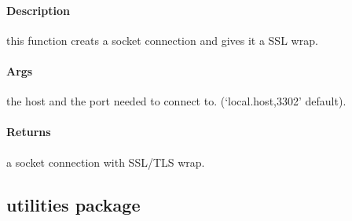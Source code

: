\documentclass[letterpaper,10pt,english]{sphinxmanual}
\begin{document}

\begin{fulllineitems}
\label{\detokenize{connection:connection.socket_connection.connect_to_ssl_socket}}
\pysigstartsignatures
{}
\pysigstopsignatures

\paragraph{Description}
\label{\detokenize{connection:description}}
\sphinxAtStartPar
this function creats a socket connection and gives it a SSL wrap.


\paragraph{Args}
\label{\detokenize{connection:args}}\begin{description}
\sphinxAtStartPar
the host and the port needed to connect to.
(‘local.host,3302’ default).

\end{description}


\paragraph{Returns}
\label{\detokenize{connection:returns}}\begin{description}
\sphinxAtStartPar
a socket connection with SSL/TLS wrap.

\end{description}

\end{fulllineitems}

\label{\detokenize{connection:connections}}
\sphinxstepscope


\subsection{utilities package}
\label{\detokenize{utilities:utilities-package}}\label{\detokenize{utilities::doc}}
\end{document}
